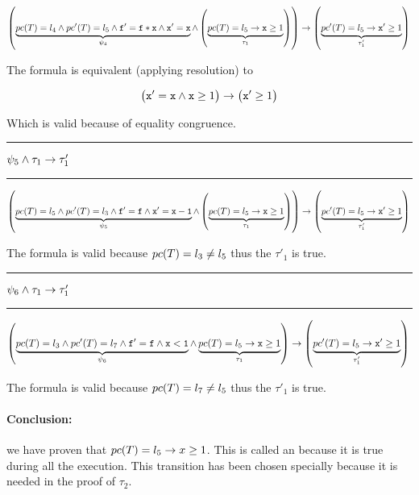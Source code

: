 	\begin{dmath*}[indentstep={5em}]
		\left(
			\underbrace{\pc(T) = l_4 \andcond \pc'(T) = l_5 \andcond \mathtt{f}' = \mathtt{f*x} \andcond \mathtt{x'=x}}_{\psi_4} \andcond \left(\underbrace{\pc(T) = l_5 \to \mathtt{x}\geq 1}_{\tau_1}\right)
		\right) 
			\to\left(\underbrace{\pc'(T) = l_5 \to \mathtt{x}' \geq 1}_{\tau_1'}\right)\\\\
	\end{dmath*}

	The formula is equivalent (applying resolution) to

	

	\begin{dmath*}[indentstep={5em}]
		\left(
			\mathtt{x'=x} \andcond  \mathtt{x}\geq 1
		\right) 
		\to \left(\mathtt{x}'\geq 1\right)
	\end{dmath*}

	Which is valid because of equality congruence.

	\rule{1cm}{0.2pt} \;$\psi_5 \wedge \tau_1 \to \tau_1'$\; \rule{1cm}{0.2pt}
	

	\begin{dmath*}[indentstep={5em}]
		\left(
			\underbrace{\pc(T) = l_5 \andcond \pc'(T) = l_3 \andcond \mathtt{f'=f} \andcond \mathtt{x'=x-1}}_{\psi_5} \andcond \left(\underbrace{\pc(T) = l_5 \to \mathtt{x}\geq 1}_{\tau_1}\right)
		\right) 
			\to\left(\underbrace{\pc'(T) = l_5 \to \mathtt{x}' \geq 1}_{\tau_1'}\right)\\\\
	\end{dmath*}

	The formula is valid because $pc(T) = l_3 \neq l_5$ thus the $\tau'_1$ is true.

	\rule{1cm}{0.2pt} \;$\psi_6 \wedge \tau_1 \to \tau_1'$\; \rule{1cm}{0.2pt}
	

	\begin{dmath*}[indentstep={5em}]
		\left(
			\underbrace{\pc(T) = l_3 \andcond \pc'(T) = l_7 \andcond \mathtt{f'=f} \andcond \mathtt{x<1}}_{\psi_6} \andcond \underbrace{\pc(T) = l_5 \to \mathtt{x} \geq 1}_{\tau_1}
		\right) 
			\to \left(\underbrace{\pc'(T) = l_5 \to \mathtt{x}' \geq 1}_{\tau_1'}\right)\\\\
	\end{dmath*}

	The formula is valid because $pc(T) = l_7 \neq l_5$ thus the $\tau'_1$ is true.


\paragraph{Conclusion:} we have proven that $pc(T) = l_5 \to x \geq 1$. 
%
This is called an  because it is true during all the execution. 
%
This transition has been chosen specially because it is needed in the proof of $\tau_2$.

